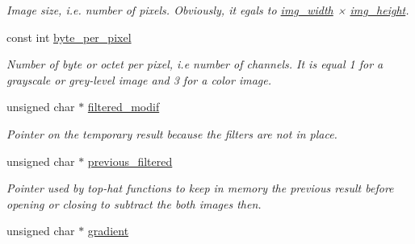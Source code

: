 \begin{DoxyCompactItemize}
\begin{DoxyCompactList}\small\item\em Image size, i.\-e. number of pixels. Obviously, it egals to \hyperlink{classofeli_1_1_filters_adfafb4edd683c3cc02997328296df055}{img\-\_\-width} × \hyperlink{classofeli_1_1_filters_a433940423042a8efbdbf1576db1cfa70}{img\-\_\-height}. \end{DoxyCompactList}\item 
\hypertarget{classofeli_1_1_filters_a229e0fc77f59c4747d0251e38cee38a9}{const int \hyperlink{classofeli_1_1_filters_a229e0fc77f59c4747d0251e38cee38a9}{byte\-\_\-per\-\_\-pixel}}\label{classofeli_1_1_filters_a229e0fc77f59c4747d0251e38cee38a9}

\begin{DoxyCompactList}\small\item\em Number of byte or octet per pixel, i.\-e number of channels. It is equal 1 for a grayscale or grey-\/level image and 3 for a color image. \end{DoxyCompactList}\item 
\hypertarget{classofeli_1_1_filters_a888566343f6d0f63576c613d2418a83c}{unsigned char $\ast$ \hyperlink{classofeli_1_1_filters_a888566343f6d0f63576c613d2418a83c}{filtered\-\_\-modif}}\label{classofeli_1_1_filters_a888566343f6d0f63576c613d2418a83c}

\begin{DoxyCompactList}\small\item\em Pointer on the temporary result because the filters are not in place. \end{DoxyCompactList}\item 
\hypertarget{classofeli_1_1_filters_af5553609150251d5e5dbcf6a320136db}{unsigned char $\ast$ \hyperlink{classofeli_1_1_filters_af5553609150251d5e5dbcf6a320136db}{previous\-\_\-filtered}}\label{classofeli_1_1_filters_af5553609150251d5e5dbcf6a320136db}

\begin{DoxyCompactList}\small\item\em Pointer used by top-\/hat functions to keep in memory the previous result before opening or closing to subtract the both images then. \end{DoxyCompactList}\item 
\hypertarget{classofeli_1_1_filters_a9c02bc4005c55eeb5a426485af0d03a9}{unsigned char $\ast$ \hyperlink{classofeli_1_1_filters_a9c02bc4005c55eeb5a426485af0d03a9}{gradient}}\label{classofeli_1_1_filters_a9c02bc4005c55eeb5a426485af0d03a9}


\end{DoxyCompactItemize}
